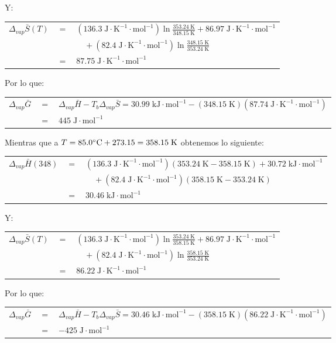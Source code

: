 \documentclass[a4paper,12pt]{article}
\begin{document}
\begin{enumerate}
Y:

\begin{tabular}{r c l}
$\Delta_{vap}\bar{S}(T)$ & $=$ & $(136.3\;\mbox{J}\cdot\mbox{K}^{-1}\cdot\mbox{mol}^{-1})\ln\frac{353.24\;\mbox{K}}{348.15\;\mbox{K}}+86.97\;\mbox{J}\cdot\mbox{K}^{-1}\cdot\mbox{mol}^{-1}$ \\
& & $\quad+(82.4\;\mbox{J}\cdot\mbox{K}^{-1}\cdot\mbox{mol}^{-1})\ln\frac{348.15\;\mbox{K}}{353.24\;\mbox{K}}$ \\
& $=$ & $87.75\;\mbox{J}\cdot\mbox{K}^{-1}\cdot\mbox{mol}^{-1}$ 
\end{tabular}

Por lo que:

\begin{tabular}{r c l}
$\Delta_{vap}\bar{G}$ & $=$ & $\Delta_{vap}\bar{H}-T_b\Delta_{vap}\bar{S}=30.99\;\mbox{kJ}\cdot\mbox{mol}^{-1}-(348.15\;\mbox{K})(87.74\;\mbox{J}\cdot\mbox{K}^{-1}\cdot\mbox{mol}^{-1})$ \\
& $=$ & $445\;\mbox{J}\cdot\mbox{mol}^{-1}$
\end{tabular}

Mientras que a $T=85.0\celsius+273.15=358.15\;\mbox{K}$ obtenemos lo siguiente:

\begin{tabular}{r c l}
$\Delta_{vap}\bar{H}(348)$ & $=$ & $(136.3\;\mbox{J}\cdot\mbox{K}^{-1}\cdot\mbox{mol}^{-1})(353.24\;\mbox{K}-358.15\;\mbox{K})+30.72\;\mbox{kJ}\cdot\mbox{mol}^{-1}$ \\
& & $\quad+(82.4\;\mbox{J}\cdot\mbox{K}^{-1}\cdot\mbox{mol}^{-1})(358.15\;\mbox{K}-353.24\;\mbox{K})$ \\
& $=$ & $30.46\;\mbox{kJ}\cdot\mbox{mol}^{-1}$ 
\end{tabular}

Y:

\begin{tabular}{r c l}
$\Delta_{vap}\bar{S}(T)$ & $=$ & $(136.3\;\mbox{J}\cdot\mbox{K}^{-1}\cdot\mbox{mol}^{-1})\ln\frac{353.24\;\mbox{K}}{358.15\;\mbox{K}}+86.97\;\mbox{J}\cdot\mbox{K}^{-1}\cdot\mbox{mol}^{-1}$ \\
& & $\quad+(82.4\;\mbox{J}\cdot\mbox{K}^{-1}\cdot\mbox{mol}^{-1})\ln\frac{358.15\;\mbox{K}}{353.24\;\mbox{K}}$ \\
& $=$ & $86.22\;\mbox{J}\cdot\mbox{K}^{-1}\cdot\mbox{mol}^{-1}$ 
\end{tabular}

Por lo que:

\begin{tabular}{r c l}
$\Delta_{vap}\bar{G}$ & $=$ & $\Delta_{vap}\bar{H}-T_b\Delta_{vap}\bar{S}=30.46\;\mbox{kJ}\cdot\mbox{mol}^{-1}-(358.15\;\mbox{K})(86.22\;\mbox{J}\cdot\mbox{K}^{-1}\cdot\mbox{mol}^{-1})$ \\
& $=$ & $-425\;\mbox{J}\cdot\mbox{mol}^{-1}$
\end{tabular}


\end{enumerate}
\end{document}
